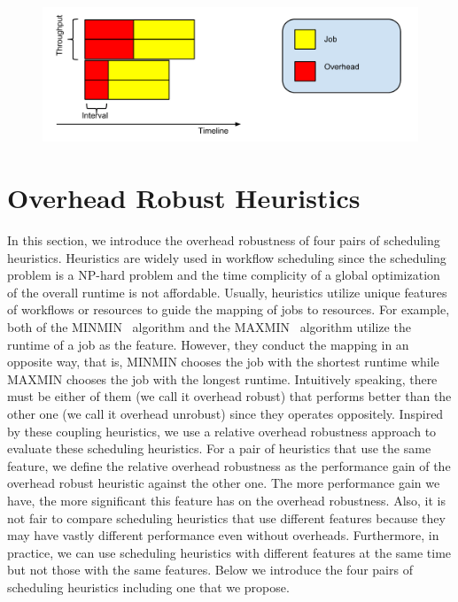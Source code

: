 \begin{figure}[htb]
\centering
 \includegraphics[width=1\linewidth]{figure/incremental.pdf}
  \label{fig:ipp}
  \vspace{-10pt}
\end{figure}

\section{Overhead Robust Heuristics}
\label{sec:heuristics}
In this section, we introduce the overhead robustness of four pairs of scheduling heuristics. Heuristics are widely used in workflow scheduling since the scheduling problem is a NP-hard problem and the time complicity of a global optimization of the overall runtime is not affordable. Usually, heuristics utilize unique features of workflows or resources to guide the mapping of jobs to resources. For example, both of the MINMIN~\cite{Blythe2005} algorithm and the MAXMIN~\cite{Braun2001} algorithm utilize the runtime of a job as the feature. However, they conduct the mapping in an opposite way, that is, MINMIN chooses the job with the shortest runtime while MAXMIN chooses the job with the longest runtime. Intuitively speaking, there must be either of them (we call it overhead robust) that performs better than the other one (we call it overhead unrobust) since they operates oppositely. Inspired by these coupling heuristics, we use a relative overhead robustness approach to evaluate these scheduling heuristics. For a pair of heuristics that use the same feature, we define the relative overhead robustness as the performance gain of the overhead robust heuristic against the other one. The more performance gain we have, the more significant this feature has on the overhead robustness. Also, it is not fair to compare scheduling heuristics that use different features because they may have vastly different performance even without overheads. Furthermore, in practice, we can use scheduling heuristics with different features at the same time but not those with the same features. 
Below we introduce the four pairs of scheduling heuristics including one that we propose. 

